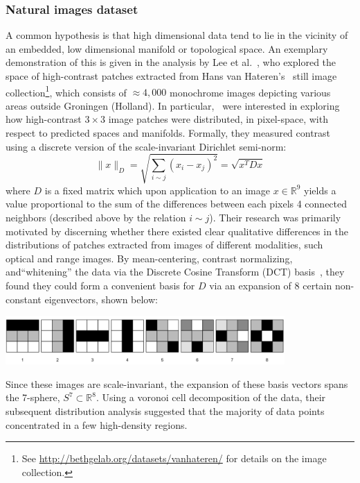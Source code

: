 \documentclass[sn-mathphys]{sn-jnl}
\begin{document}
 \subsubsection{Natural images dataset}\label{sec:natural_images}
A common hypothesis is that high dimensional data tend to lie in the vicinity of an embedded, low dimensional manifold or topological space. An exemplary demonstration of this is given in the analysis by Lee et al.~\cite{lee2003nonlinear}, who explored the space of high-contrast patches extracted from Hans van Hateren's~\cite{hateren_schaaf_1998} still image collection\footnote{See \url{http://bethgelab.org/datasets/vanhateren/} for details on the image collection.}, which consists of $\approx 4,000$ monochrome images depicting various areas outside Groningen (Holland). 
In particular,~\cite{lee2003nonlinear} were interested in exploring how high-contrast $3 \times 3$ image patches  were distributed, in pixel-space, with respect to predicted spaces and manifolds.
Formally, they measured contrast using a discrete version of the scale-invariant Dirichlet semi-norm:
$$ \lVert x \rVert_D = \sqrt{\sum_{i \sim j}(x_i - x_j)^2} = \sqrt{x^T D x}$$
where $D$ is a fixed matrix which upon application to an image $x \in \mathbb{R}^9$ yields a value proportional to the sum of the differences between each pixels 4 connected neighbors (described above by the relation $i \sim j$).
Their research was primarily motivated by discerning whether there existed clear qualitative differences in the distributions of patches extracted from images of different modalities, such optical and range images.
By mean-centering, contrast normalizing, and``whitening'' the data via the Discrete Cosine Transform (DCT) basis~\cite{lee2003nonlinear}, they found they could form a convenient basis for $D$ via an expansion of 8 certain non-constant eigenvectors, shown below: 
\begin{center}
	\includegraphics[width=0.80\textwidth]{dct_basis} 
\end{center}
Since these images are scale-invariant, the expansion of these basis vectors spans the 7-sphere, $S^7 \subset \mathbb{R}^8$. Using a voronoi cell decomposition of the data, their subsequent distribution analysis suggested that the majority of data points concentrated in a few high-density regions. 
\end{document}
